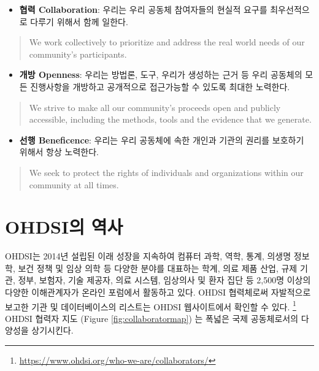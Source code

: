 \documentclass[11pt]{book}
\providecommand{\tightlist}{%
  \setlength{\itemsep}{0pt}\setlength{\parskip}{0pt}}
\let\rmarkdownfootnote\footnote%
\def\footnote{\protect\rmarkdownfootnote}
\theoremstyle{definition}
\theoremstyle{definition}
\theoremstyle{definition}
\theoremstyle{remark}
\begin{document}
\begin{itemize}
\tightlist
\item
  \textbf{협력 Collaboration}: 우리는 우리 공동체 참여자들의 현실적
  요구를 최우선적으로 다루기 위해서 함께 일한다.
\end{itemize}

\begin{quote}
We work collectively to prioritize and address the real world needs of
our community's participants.
\end{quote}

\begin{itemize}
\tightlist
\item
  \textbf{개방 Openness}: 우리는 방법론, 도구, 우리가 생성하는 근거 등
  우리 공동체의 모든 진행사항을 개방하고 공개적으로 접근가능할 수 있도록
  최대한 노력한다.
\end{itemize}

\begin{quote}
We strive to make all our community's proceeds open and publicly
accessible, including the methods, tools and the evidence that we
generate.
\end{quote}

\begin{itemize}
\tightlist
\item
  \textbf{선행 Beneficence}: 우리는 우리 공동체에 속한 개인과 기관의
  권리를 보호하기 위해서 항상 노력한다.
\end{itemize}

\begin{quote}
We seek to protect the rights of individuals and organizations within
our community at all times.
\end{quote}


\hypertarget{ohdsi-}{\section{OHDSI의 역사}\label{ohdsi-}}

OHDSI는 2014년 설립된 이래 성장을 지속하여 컴퓨터 과학, 역학, 통계,
의생명 정보학, 보건 정책 및 임상 의학 등 다양한 분야를 대표하는 학계,
의료 제품 산업, 규제 기관, 정부, 보험자, 기술 제공자, 의료 시스템,
임상의사 및 환자 집단 등 2,500명 이상의 다양한 이해관계자가 온라인
포럼에서 활동하고 있다. OHDSI 협력체로써 자발적으로 보고한 기관 및
데이터베이스의 리스트는 OHDSI 웹사이트에서 확인할 수 있다. \footnote{\url{https://www.ohdsi.org/who-we-are/collaborators/}}
OHDSI 협력자 지도 (Figure \ref{fig:collaboratormap}) 는 폭넓은 국제
공동체로서의 다양성을 상기시킨다.
\end{document}
